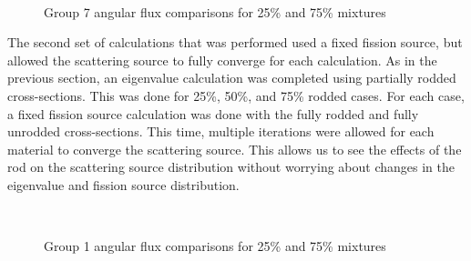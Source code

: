 \begin{figure}[H]
    \centering
    \hfill
    ~
    \caption{Group 7 angular flux comparisons for 25\% and 75\% mixtures}\label{f:1dmoc-angflux7}
\end{figure}

The second set of calculations that was performed used a fixed fission source, but allowed the scattering source to fully converge for each calculation.  As in the previous section, an eigenvalue calculation was completed using partially rodded cross-sections.  This was done for 25\%, 50\%, and 75\% rodded cases.  For each case, a fixed fission source calculation was done with the fully rodded and fully unrodded cross-sections.  This time, multiple iterations were allowed for each material to converge the scattering source.  This allows us to see the effects of the rod on the scattering source distribution without worrying about changes in the eigenvalue and fission source distribution.

\begin{figure}[H]
    \centering
    \hfill
    ~
    \caption{Group 1 angular flux comparisons for 25\% and 75\% mixtures}\label{f:1dmoc-angflux1}
\end{figure}


